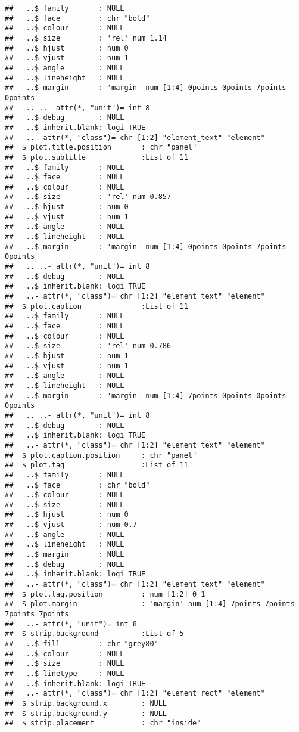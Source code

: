 \documentclass[
]{article}
\begin{document}
\begin{verbatim}
##   ..$ family       : NULL
##   ..$ face         : chr "bold"
##   ..$ colour       : NULL
##   ..$ size         : 'rel' num 1.14
##   ..$ hjust        : num 0
##   ..$ vjust        : num 1
##   ..$ angle        : NULL
##   ..$ lineheight   : NULL
##   ..$ margin       : 'margin' num [1:4] 0points 0points 7points 0points
##   .. ..- attr(*, "unit")= int 8
##   ..$ debug        : NULL
##   ..$ inherit.blank: logi TRUE
##   ..- attr(*, "class")= chr [1:2] "element_text" "element"
##  $ plot.title.position       : chr "panel"
##  $ plot.subtitle             :List of 11
##   ..$ family       : NULL
##   ..$ face         : NULL
##   ..$ colour       : NULL
##   ..$ size         : 'rel' num 0.857
##   ..$ hjust        : num 0
##   ..$ vjust        : num 1
##   ..$ angle        : NULL
##   ..$ lineheight   : NULL
##   ..$ margin       : 'margin' num [1:4] 0points 0points 7points 0points
##   .. ..- attr(*, "unit")= int 8
##   ..$ debug        : NULL
##   ..$ inherit.blank: logi TRUE
##   ..- attr(*, "class")= chr [1:2] "element_text" "element"
##  $ plot.caption              :List of 11
##   ..$ family       : NULL
##   ..$ face         : NULL
##   ..$ colour       : NULL
##   ..$ size         : 'rel' num 0.786
##   ..$ hjust        : num 1
##   ..$ vjust        : num 1
##   ..$ angle        : NULL
##   ..$ lineheight   : NULL
##   ..$ margin       : 'margin' num [1:4] 7points 0points 0points 0points
##   .. ..- attr(*, "unit")= int 8
##   ..$ debug        : NULL
##   ..$ inherit.blank: logi TRUE
##   ..- attr(*, "class")= chr [1:2] "element_text" "element"
##  $ plot.caption.position     : chr "panel"
##  $ plot.tag                  :List of 11
##   ..$ family       : NULL
##   ..$ face         : chr "bold"
##   ..$ colour       : NULL
##   ..$ size         : NULL
##   ..$ hjust        : num 0
##   ..$ vjust        : num 0.7
##   ..$ angle        : NULL
##   ..$ lineheight   : NULL
##   ..$ margin       : NULL
##   ..$ debug        : NULL
##   ..$ inherit.blank: logi TRUE
##   ..- attr(*, "class")= chr [1:2] "element_text" "element"
##  $ plot.tag.position         : num [1:2] 0 1
##  $ plot.margin               : 'margin' num [1:4] 7points 7points 7points 7points
##   ..- attr(*, "unit")= int 8
##  $ strip.background          :List of 5
##   ..$ fill         : chr "grey80"
##   ..$ colour       : NULL
##   ..$ size         : NULL
##   ..$ linetype     : NULL
##   ..$ inherit.blank: logi TRUE
##   ..- attr(*, "class")= chr [1:2] "element_rect" "element"
##  $ strip.background.x        : NULL
##  $ strip.background.y        : NULL
##  $ strip.placement           : chr "inside"

\end{verbatim}
\end{document}
